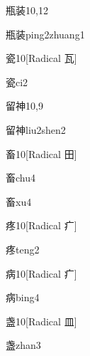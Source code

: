 \begin{entry}{瓶装}{10,12}
  \begin{phonetics}{瓶装}{ping2zhuang1}
  \end{phonetics}
\end{entry}

\begin{entry}{瓷}{10}[Radical ⽡]
  \begin{phonetics}{瓷}{ci2}
  \end{phonetics}
\end{entry}

\begin{entry}{留神}{10,9}
  \begin{phonetics}{留神}{liu2shen2}
  \end{phonetics}
\end{entry}

\begin{entry}{畜}{10}[Radical ⽥]
  \begin{phonetics}{畜}{chu4}
  \end{phonetics}
  \begin{phonetics}{畜}{xu4}
  \end{phonetics}
\end{entry}

\begin{entry}{疼}{10}[Radical 疒]
  \begin{phonetics}{疼}{teng2}
  \end{phonetics}
\end{entry}

\begin{entry}{病}{10}[Radical 疒]
  \begin{phonetics}{病}{bing4}
  \end{phonetics}
\end{entry}

\begin{entry}{盏}{10}[Radical 皿]
  \begin{phonetics}{盏}{zhan3}
  \end{phonetics}
\end{entry}

